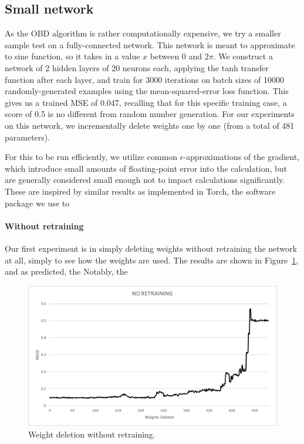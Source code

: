 \documentclass[10pt,twocolumn,letterpaper]{article}
\begin{document}
\subsection{Small network}
As the OBD algorithm is rather computationally expensive, we try a smaller sample test on a fully-connected network.
This network is meant to approximate to sine function, so it takes in a value $x$ between 0 and $2\pi$.
We construct a network of 2 hidden layers of 20 neurons each, applying the tanh transfer function after each layer, and train for 3000 iterations on batch sizes of 10000 randomly-generated examples using the mean-squared-error loss function.
This gives us a trained MSE of 0.047, recalling that for this specific training case, a score of 0.5 is no different from random number generation.
For our experiments on this network, we incrementally delete weights one by one (from a total of 481 parameters).

For this to be run efficiently, we utilize common $\epsilon$-approximations of the gradient, which introduce small amounts of floating-point error into the calculation, but are generally considered small enough not to impact calculations significantly.
These are inspired by similar results as implemented in Torch, the software package we use to 

\paragraph{Without retraining} Our first experiment is in simply deleting weights without retraining the network at all, simply to see how the weights are used.
The results are shown in Figure~\ref{fig:sin-no}, and as predicted, the 
Notably, the 

\begin{figure}[h]
  \centering
  \includegraphics[width=\linewidth]{sin-no-retraining.pdf}
  \caption{Weight deletion without retraining.}
  \label{fig:sin-no}
\end{figure}
\end{document}
